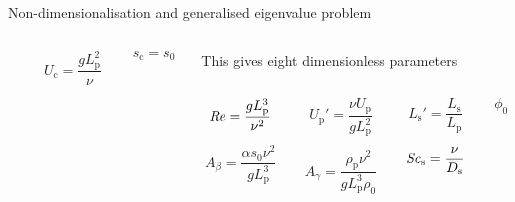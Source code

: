 \documentclass[final]{beamer} %
\newcommand\Rey{\mbox{\textit{Re}}}  %
\newcommand\Sc{\mbox{\textit{Sc}}}  %
\begin{document}
\begin{frame}[t]
\begin{columns}[t]
\begin{column}{0.6\paperwidth}
\begin{block}{Non-dimensionalisation and generalised eigenvalue problem}
\begin{columns}[t]
\begin{column}{0.21\paperwidth}
\begin{columns}[t]
\begin{column}{0.07\paperwidth}
              \end{column}
          
              \begin{column}{0.07\paperwidth}
                \centering

                $$ U_{\text{c}} = \frac{g L_{\text{p}}^{2}}{\nu} $$

              \end{column}

              \begin{column}{0.07\paperwidth}
                \centering

                $$ s_{\text{c}} = s_{0} $$

              \end{column}
              
            \end{columns}

          \end{column}

          \begin{column}{0.29\paperwidth}
            \centering This gives eight dimensionless parameters

            \vspace{-1cm}

            \begin{columns}[t]
              \begin{column}{0.07\paperwidth}
                $$ \Rey = \frac{g L_{\text{p}}^{3}}{\nu^{2}} $$

                $$A_{\beta} = \frac{\alpha s_{0} \nu^{2}}{g L_{\text{p}}^{3}}$$
              \end{column}

              \begin{column}{0.07\paperwidth}
                $$U_{\text{p}}' = \frac{\nu U_{\text{p}}}{g L_{\text{p}}^{2}}$$

                $$A_{\gamma} = \frac{\rho_{\text{p}} \nu^{2}}{g L_{\text{p}}^{3} \rho_{0}}$$
              \end{column}

              \begin{column}{0.07\paperwidth}
                $$L_{\text{s}}' = \frac{L_{\text{s}}}{L_{\text{p}}}$$

                $$\Sc_{\text{s}} = \frac{\nu}{D_{\text{s}}}$$
              \end{column}

              \begin{column}{0.07\paperwidth}
                $$\phi_{0}$$


\end{column}
\end{columns}
\end{column}
\end{columns}
\end{block}
\end{column}
\end{columns}
\end{frame}
\end{document}
